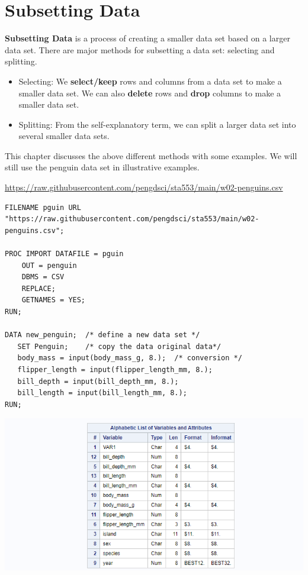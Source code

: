 \documentclass[
]{book}
\begin{document}
\hypertarget{subsetting-data}{%
\chapter{Subsetting Data}\label{subsetting-data}}

\textbf{Subsetting Data} is a process of creating a smaller data set based on a larger data set. There are major methods for subsetting a data set: selecting and splitting.

\begin{itemize}
\item
  Selecting: We \textbf{select/keep} rows and columns from a data set to make a smaller data set. We can also \textbf{delete} rows and \textbf{drop} columns to make a smaller data set.
\item
  Splitting: From the self-explanatory term, we can split a larger data set into several smaller data sets.
\end{itemize}

This chapter discusses the above different methods with some examples. We will still use the penguin data set in illustrative examples.

\url{https://raw.githubusercontent.com/pengdsci/sta553/main/w02-penguins.csv}

\begin{verbatim}
FILENAME pguin URL "https://raw.githubusercontent.com/pengdsci/sta553/main/w02-penguins.csv";

PROC IMPORT DATAFILE = pguin
    OUT = penguin        
    DBMS = CSV  
    REPLACE;
    GETNAMES = YES;
RUN;

DATA new_penguin;  /* define a new data set */
   SET Penguin;    /* copy the data original data*/
   body_mass = input(body_mass_g, 8.);  /* conversion */
   flipper_length = input(flipper_length_mm, 8.);
   bill_depth = input(bill_depth_mm, 8.);
   bill_length = input(bill_length_mm, 8.);
RUN;
\end{verbatim}

\begin{center}\includegraphics[width=1\linewidth]{img07/w07-penguinContents} \end{center}
\end{document}
